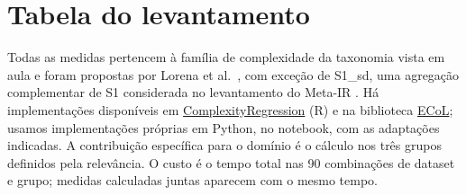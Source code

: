 \documentclass[10pt,a4paper]{article}
\begin{document}
\clearpage
\appendix
\section{Tabela do levantamento}

Todas as medidas pertencem à família de complexidade da taxonomia vista em aula e foram propostas por Lorena et al.\ \cite{lorena}, com exceção de S1\_sd, uma agregação complementar de S1 considerada no levantamento do Meta-IR \cite{avelino}. Há implementações disponíveis em \href{https://github.com/aclorena/ComplexityRegression}{ComplexityRegression} (R) e na biblioteca \href{https://github.com/lpfgarcia/ECoL}{ECoL}; usamos implementações próprias em Python, no notebook, com as adaptações indicadas. A contribuição específica para o domínio é o cálculo nos três grupos definidos pela relevância. O custo é o tempo total nas 90 combinações de dataset e grupo; medidas calculadas juntas aparecem com o mesmo tempo.
\end{document}
